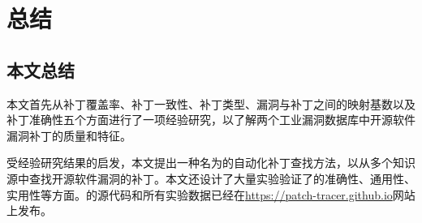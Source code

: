 \chapter{总结}


\section{本文总结}
本文首先从补丁覆盖率、补丁一致性、补丁类型、漏洞与补丁之间的映射基数以及补丁准确性五个方面进行了一项经验研究，以了解两个工业漏洞数据库中开源软件漏洞补丁的质量和特征。

受经验研究结果的启发，本文提出一种名为\tool 的自动化补丁查找方法，以从多个知识源中查找开源软件漏洞的补丁。本文还设计了大量实验验证了\tool 的准确性、通用性、实用性等方面。\tool 的源代码和所有实验数据已经在\url{https://patch-tracer.github.io}网站上发布。


